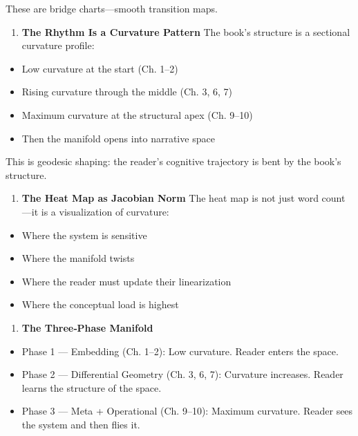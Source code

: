 \documentclass[
]{article}
\providecommand{\tightlist}{%
  \setlength{\itemsep}{0pt}\setlength{\parskip}{0pt}}
\begin{document}
These are bridge charts---smooth transition maps.

\begin{enumerate}
\def\labelenumi{\arabic{enumi}.}
\setcounter{enumi}{3}
\tightlist
\item
  \textbf{The Rhythm Is a Curvature Pattern} The book's structure is a
  sectional curvature profile:
\end{enumerate}

\begin{itemize}
\tightlist
\item
  Low curvature at the start (Ch. 1--2)
\item
  Rising curvature through the middle (Ch. 3, 6, 7)
\item
  Maximum curvature at the structural apex (Ch. 9--10)
\item
  Then the manifold opens into narrative space
\end{itemize}

This is geodesic shaping: the reader's cognitive trajectory is bent by
the book's structure.

\begin{enumerate}
\def\labelenumi{\arabic{enumi}.}
\setcounter{enumi}{4}
\tightlist
\item
  \textbf{The Heat Map as Jacobian Norm} The heat map is not just word
  count---it is a visualization of curvature:
\end{enumerate}

\begin{itemize}
\tightlist
\item
  Where the system is sensitive
\item
  Where the manifold twists
\item
  Where the reader must update their linearization
\item
  Where the conceptual load is highest
\end{itemize}

\begin{enumerate}
\def\labelenumi{\arabic{enumi}.}
\setcounter{enumi}{5}
\tightlist
\item
  \textbf{The Three‑Phase Manifold}
\end{enumerate}

\begin{itemize}
\tightlist
\item
  Phase 1 --- Embedding (Ch. 1--2): Low curvature. Reader enters the
  space.
\item
  Phase 2 --- Differential Geometry (Ch. 3, 6, 7): Curvature increases.
  Reader learns the structure of the space.
\item
  Phase 3 --- Meta + Operational (Ch. 9--10): Maximum curvature. Reader
  sees the system and then flies it.
\end{itemize}
\end{document}
